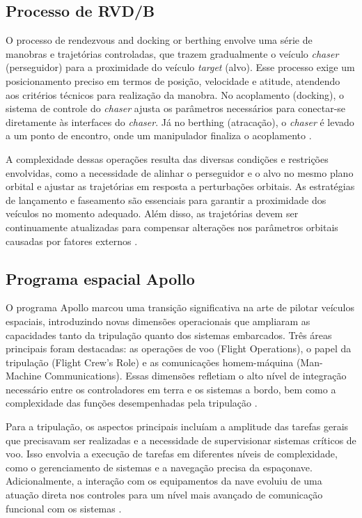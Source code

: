 \subsection{Processo de RVD/B}

O processo de rendezvous and docking or berthing envolve uma série de manobras e trajetórias controladas, que trazem gradualmente o veículo \textit{chaser} (perseguidor) para a proximidade do veículo \textit{target} (alvo). Esse processo exige um posicionamento preciso em termos de posição, velocidade e atitude, atendendo aos critérios técnicos para realização da manobra.
No acoplamento (docking), o sistema de controle do \textit{chaser} ajusta os parâmetros necessários para conectar-se diretamente às interfaces do \textit{chaser}.
Já no berthing (atracação), o \textit{chaser} é levado a um ponto de encontro, onde um manipulador finaliza o acoplamento \citep{fehse2003}.

A complexidade dessas operações resulta das diversas condições e restrições envolvidas, como a necessidade de alinhar o perseguidor e o alvo no mesmo plano orbital e ajustar as trajetórias em resposta a perturbações orbitais.
As estratégias de lançamento e faseamento são essenciais para garantir a proximidade dos veículos no momento adequado. Além disso, as trajetórias devem ser continuamente atualizadas para compensar alterações nos parâmetros orbitais causadas por fatores externos \citep{fehse2003}.

\subsection{Programa espacial Apollo}

O programa Apollo marcou uma transição significativa na arte de pilotar veículos espaciais, introduzindo novas dimensões operacionais que ampliaram as capacidades tanto da tripulação quanto dos sistemas embarcados. Três áreas principais foram destacadas: as operações de voo (Flight Operations), o papel da tripulação (Flight Crew's Role) e as comunicações homem-máquina (Man-Machine Communications). Essas dimensões refletiam o alto nível de integração necessário entre os controladores em terra e os sistemas a bordo, bem como a complexidade das funções desempenhadas pela tripulação \citep{nevins1971}.

Para a tripulação, os aspectos principais incluíam a amplitude das tarefas gerais que precisavam ser realizadas e a necessidade de supervisionar sistemas críticos de voo. Isso envolvia a execução de tarefas em diferentes níveis de complexidade, como o gerenciamento de sistemas e a navegação precisa da espaçonave. Adicionalmente, a interação com os equipamentos da nave evoluiu de uma atuação direta nos controles para um nível mais avançado de comunicação funcional com os sistemas \citep{nevins1971}.

